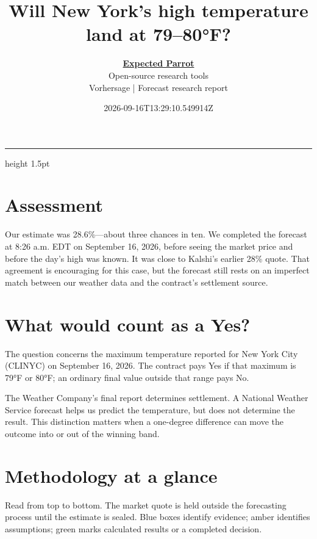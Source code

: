 \documentclass[11pt]{article}
\title{Will New York’s high temperature land at 79–80°F?}
\author{\href{https://www.expectedparrot.com/}{\textcolor{epgreen}{\textbf{Expected Parrot}}}\\{\small Open-source research tools}\\[4pt]{\small Vorhersage | Forecast research report}}
\date{2026-09-16T13:29:10.549914Z}
\begin{document}
\maketitle
{\color{epgreen}\hrule height 1.5pt}\vspace{8pt}
\section*{\textcolor{epdarkgreen}{Assessment}}
Our estimate was 28.6\%—about three chances in ten. We completed the forecast at 8:26 a.m. EDT on September 16, 2026, before seeing the market price and before the day’s high was known. It was close to Kalshi’s earlier 28\% quote. That agreement is encouraging for this case, but the forecast still rests on an imperfect match between our weather data and the contract’s settlement source.


\section*{\textcolor{epdarkgreen}{What would count as a Yes?}}
The question concerns the maximum temperature reported for New York City (CLINYC) on September 16, 2026. The contract pays Yes if that maximum is 79°F or 80°F; an ordinary final value outside that range pays No.


The Weather Company’s final report determines settlement. A National Weather Service forecast helps us predict the temperature, but does not determine the result. This distinction matters when a one-degree difference can move the outcome into or out of the winning band.


\clearpage
\section*{\textcolor{epdarkgreen}{Methodology at a glance}}
Read from top to bottom. The market quote is held outside the forecasting process until the estimate is sealed. Blue boxes identify evidence; amber identifies assumptions; green marks calculated results or a completed decision.
\end{document}
